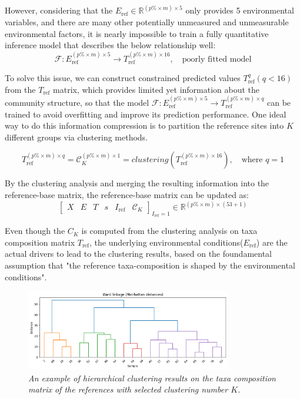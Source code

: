 However, considering that the \(E_{\text{ref}} \in \mathbb{R}^{(p\% \times m) \times 5}\) only provides 5 environmental variables,
and there are many other potentially unmeasured and unmeasurable environmental factors, it is nearly impossible to train a fully quantitative
inference model that describes the below relationship well:
\[
\mathcal{F} : E_{\text{ref}}^{(p\% \times m) \times 5} \to T_{\text{ref}}^{(p\% \times m) \times 16}, \quad \text{poorly fitted model}
\]

To solve this issue, we can construct constrained predicted values \(T_{\text{ref}}^{q} (q < 16)\) from the \(T_{\text{ref}}\) matrix, which 
provides limited yet information about the community structure, so that the model $\mathcal{F} : E_{\text{ref}}^{(p\% \times m) \times 5} \to T_{\text{ref}}^{(p\% \times m) \times q}$
can be trained to avoid overfitting and improve its prediction performance. One ideal way to do this information compression is 
to partition the reference sites into \(K\) different groups via clustering methods.

\[
T_{\text{ref}}^{(p\% \times m) \times q} = \mathcal{C}_K^{(p\% \times m) \times 1}  = clustering(T_{\text{ref}}^{(p\% \times m) \times 16}), \quad \text{where } q = 1
\]

By the clustering analysis and merging the resulting information into the reference-base matrix, the reference-base matrix can be updated as:
\[
\left[
\begin{array}{cccccc}
X & E & T & s & I_{\text{ref}} & \mathcal{C}_K
\end{array}
\right]_{I_{\text{ref}} = 1}
\in
\mathbb{R}^{(p\% \times m) \times (53 + 1)}
\]


Even though the \(C_K\) is computed from the clustering analysis on taxa composition matrix \(T_{\text{ref}}\),
the underlying environmental conditions(\(E_{\text{ref}}\)) are the actual drivers to lead to the clustering results,
based on the foundamental assumption that "the reference taxa-composition is shaped by the environmental conditions".

\begin{figure}[!h]
    \centering
    \includegraphics[width=0.8\textwidth]{../presentation/figures/p10_clustering_results.png}
    \caption{\textit{An example of hierarchical clustering results on the taxa composition matrix of the references
    with selected clustering number \(K\).}}
    \label{fig:p10_clustering_results}
\end{figure}


